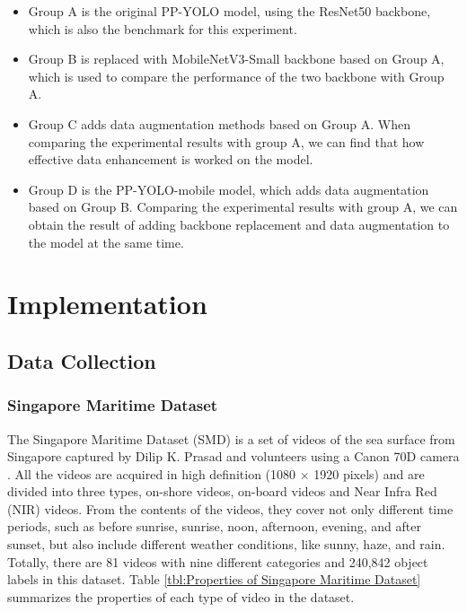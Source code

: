 \documentclass[sensors,article,submit,moreauthors,pdftex]{Definitions/mdpi}
\begin{document}
\begin{paracol}{2}
\begin{itemize}
\item{Group A is the original PP-YOLO model, using the ResNet50 backbone, which is also the benchmark for this experiment.}
\end{itemize}


\begin{itemize}
\item{Group B is replaced with MobileNetV3-Small backbone based on Group A, which is used to compare the performance of the two backbone with Group A.}
\end{itemize}

\begin{itemize}
\item{Group C adds data augmentation methods based on Group A. When comparing the experimental results with group A, we can find that how effective data enhancement is worked on the model.}
\end{itemize}

\begin{itemize}
\item{Group D is the PP-YOLO-mobile model, which adds data augmentation based on Group B. Comparing the experimental results with group A, we can obtain the result of adding backbone replacement and data augmentation to the model at the same time.}
\end{itemize}


\section{Implementation}
\subsection{Data Collection}

\subsubsection{Singapore Maritime Dataset}
The Singapore Maritime Dataset (SMD) is a set of videos of the sea surface from Singapore captured by Dilip K. Prasad and volunteers using a Canon 70D camera \cite{prasad2017video}. All the videos are acquired in high definition (1080 $\times$ 1920 pixels) and are divided into three types, on-shore videos, on-board videos and Near Infra Red (NIR) videos. From the contents of the videos, they cover not only different time periods, such as before sunrise, sunrise, noon, afternoon, evening, and after sunset, but also include different weather conditions, like sunny, haze, and rain. Totally, there are 81 videos with nine different categories and 240,842 object labels in this dataset. Table \ref{tbl:Properties of Singapore Maritime Dataset} summarizes the properties of each type of video in the dataset.


\end{paracol}
\end{document}
